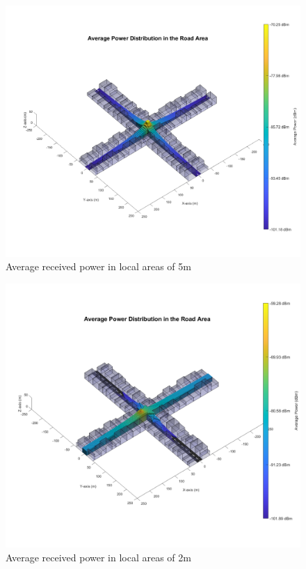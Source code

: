 \documentclass[10pt,a4paper]{ULBreport}
\begin{document}
\begin{figure}[H]
    \centering
    \includegraphics[width=1\textwidth]{3_5.png}
    \caption{Average received power in local areas of 5m}
    \label{fig:average_power}
\end{figure}

\begin{figure}[H]
    \centering
    \includegraphics[width=1\textwidth]{3_5_alt.png}
    \caption{Average received power in local areas of 2m}
    \label{fig:average_power_2m}
\end{figure}




\end{document}
